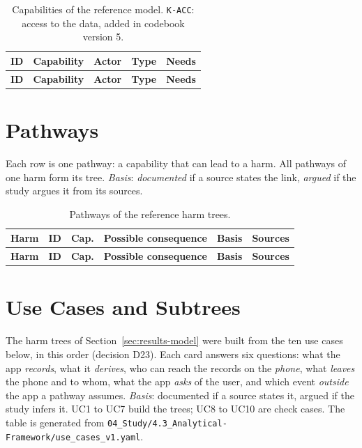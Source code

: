 {\footnotesize
\begin{longtable}{@{}lp{3.5cm}p{2.5cm}lp{4.7cm}@{}}
\caption[Capabilities of the reference model]{Capabilities of the reference model.
\texttt{K-ACC}: access to the data, added in codebook version 5.}
\label{tab:reference-capabilities}\\
\toprule
\textbf{ID} & \textbf{Capability} & \textbf{Actor} & \textbf{Type} & \textbf{Needs} \\
\midrule
\endfirsthead
\toprule
\textbf{ID} & \textbf{Capability} & \textbf{Actor} & \textbf{Type} & \textbf{Needs} \\
\midrule
\endhead
\end{longtable}}

\section{Pathways}
Each row is one pathway: a capability that can lead to a harm. All pathways of one harm form its
tree. \emph{Basis}: \emph{documented} if a source states the link, \emph{argued} if the study argues it
from its sources.

{\footnotesize
\begin{longtable}{@{}lllp{5.2cm}lp{3.5cm}@{}}
\caption[Pathways of the reference harm trees]{Pathways of the reference harm trees.}
\label{tab:reference-pathways}\\
\toprule
\textbf{Harm} & \textbf{ID} & \textbf{Cap.} & \textbf{Possible consequence} & \textbf{Basis} & \textbf{Sources} \\
\midrule
\endfirsthead
\toprule
\textbf{Harm} & \textbf{ID} & \textbf{Cap.} & \textbf{Possible consequence} & \textbf{Basis} & \textbf{Sources} \\
\midrule
\endhead
\end{longtable}}

\section{Use Cases and Subtrees}
\label{sec:app-use-cases}
The harm trees of Section~\ref{sec:results-model} were built from the ten use cases below, in this
order (decision D23). Each card answers six questions: what the app \emph{records}, what it
\emph{derives}, who can reach the records on the \emph{phone}, what \emph{leaves} the phone and to
whom, what the app \emph{asks} of the user, and which event \emph{outside} the app a pathway
assumes. \emph{Basis}: documented if a source states it, argued if the study infers it. UC1 to UC7
build the trees; UC8 to UC10 are check cases. The table is generated from
\texttt{04\_Study/4.3\_Analytical-Framework/use\_cases\_v1.yaml}.

